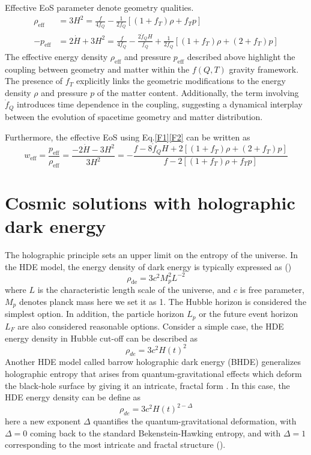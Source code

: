 \documentclass[preprint]{aastex631}
\begin{document}
Effective EoS parameter denote geometry qualities.
\begin{align}
\rho_{\text{eff}}&=3H^2=\frac{f}{4f_Q}-\frac{1}{2f_Q}[(1+f_T)\rho+f_T p] \label{F1}\\
-p_{\text{eff}}&=2\dot{H}+3H^2=\frac{f}{4f_Q}-\frac{2\dot{f}_Q H}{f_Q}+\frac{1}{2f_Q}[(1+f_T)\rho +(2+f_T)p] \label{F2}
\end{align}
The effective energy density \(\rho_{\text{eff}}\) and pressure \(p_{\text{eff}}\) described above highlight the coupling between geometry and matter within the \(f(Q, T)\) gravity framework. The presence of \(f_T\) explicitly links the geometric modifications to the energy density \(\rho\) and pressure \(p\) of the matter content. Additionally, the term involving \(\dot{f}_Q\) introduces time dependence in the coupling, suggesting a dynamical interplay between the evolution of spacetime geometry and matter distribution. 

Furthermore, the effective EoS using Eq.\eqref{F1}\eqref{F2} can be written as
\begin{equation}
w_{\text{eff}}=\frac{p_{\text{eff}}}{\rho_{\text{eff}}} = \frac{-2\dot{H}-3H^2}{3H^2}= -\frac{f - 8\dot{f}_Q H + 2[(1 + f_T)\rho + (2 + f_T)p]}{f - 2[(1 + f_T)\rho + f_T p]}
\end{equation}



\section{Cosmic solutions with holographic dark energy}

The holographic principle sets an upper limit on the entropy of the universe.  In the HDE model, the energy density of dark energy is typically expressed as (\cite{LI20041})
\begin{equation}
    \rho_\text{de} = 3c^2 M_p^2 L^{-2}
\end{equation}
where $L$ is the characteristic length scale of the universe, and $c$ is free parameter, $M_p$ denotes planck mass here we set it as 1. The Hubble horizon is considered the simplest option.  In addition, the particle horizon $L_p$ or the future event horizon $L_F$ are also considered reasonable options. Consider a simple case, the HDE energy density in Hubble cut-off can be described as 
\begin{equation}
    \rho_{de}=3c^2 H(t)^2 \label{HDE}
\end{equation}
Another HDE model called barrow holographic dark energy (BHDE) generalizes holographic entropy that arises from quantum-gravitational effects which deform the black-hole surface by giving it an intricate, fractal form . In this case, the HDE energy density can be define as
\begin{equation}
    \rho_{de}=3c^2 H(t)^{2-\Delta}\label{BHDEdef}
\end{equation}
here a new exponent $\Delta$ quantifies the quantum-gravitational deformation, with $\Delta=0$ coming back to the standard Bekenstein-Hawking entropy, and with $\Delta=1$ corresponding to the most intricate and fractal structure (\cite{PhysRevD.102.123525}).
\end{document}

